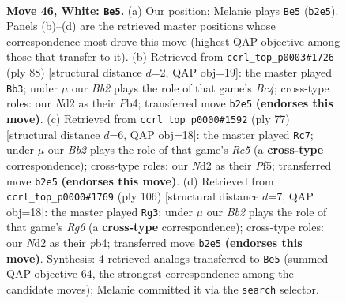 \documentclass[11pt]{article}
\begin{document}
\clearpage

\begin{figure}[p]\centering
\begin{subfigure}{0.46\textwidth}\centering
\resizebox{\linewidth}{!}{%
\newchessgame
\chessboard[
  setfen={5k2/2P5/2r5/8/5K2/8/1B1N4/8 w - - 5 46},
  showmover=false,
  pgfstyle=straightmove, color=movearrow, markmove={b2-e5}
]}
\caption{}
\end{subfigure}\hfill
\begin{subfigure}{0.46\textwidth}\centering
\resizebox{\linewidth}{!}{%
\newchessgame
\chessboard[
  setfen={1k6/8/8/8/PPB5/r7/2K5/8 w - - 1 45},
  showmover=false,
  pgfstyle=straightmove, color=movearrow, markmove={c4-b3}
]}
\caption{}
\end{subfigure}
\\[4pt]
\begin{subfigure}{0.46\textwidth}\centering
\resizebox{\linewidth}{!}{%
\newchessgame
\chessboard[
  setfen={3k4/p7/R7/5p2/2r5/8/8/6K1 b - - 1 39},
  showmover=false,
  pgfstyle=straightmove, color=movearrow, markmove={c4-c7}
]}
\caption{}
\end{subfigure}\hfill
\begin{subfigure}{0.46\textwidth}\centering
\resizebox{\linewidth}{!}{%
\newchessgame
\chessboard[
  setfen={7r/7P/6R1/3k4/1p3K2/8/8/8 w - - 1 54},
  showmover=false,
  pgfstyle=straightmove, color=movearrow, markmove={g6-g3}
]}
\caption{}
\end{subfigure}
\caption{\textbf{Move 46, White: \texttt{Be5}.} (a) Our position; Melanie plays \texttt{Be5} (\texttt{b2e5}). Panels (b)--(d) are the retrieved master positions whose correspondence most drove this move (highest QAP objective among those that transfer to it). (b) Retrieved from \texttt{ccrl\_top\_p0003\#1726} (ply 88) [structural distance $d$=2, QAP obj=19]: the master played \texttt{Bb3}; under $\mu$ our \emph{Bb2} plays the role of that game's \emph{Bc4}; cross-type roles: our \emph{N}d2 as their \emph{P}b4; transferred move \texttt{b2e5} \textbf{(endorses this move)}. (c) Retrieved from \texttt{ccrl\_top\_p0000\#1592} (ply 77) [structural distance $d$=6, QAP obj=18]: the master played \texttt{Rc7}; under $\mu$ our \emph{Bb2} plays the role of that game's \emph{Rc5} (a \textbf{cross-type} correspondence); cross-type roles: our \emph{N}d2 as their \emph{P}f5; transferred move \texttt{b2e5} \textbf{(endorses this move)}. (d) Retrieved from \texttt{ccrl\_top\_p0000\#1769} (ply 106) [structural distance $d$=7, QAP obj=18]: the master played \texttt{Rg3}; under $\mu$ our \emph{Bb2} plays the role of that game's \emph{Rg6} (a \textbf{cross-type} correspondence); cross-type roles: our \emph{N}d2 as their \emph{p}b4; transferred move \texttt{b2e5} \textbf{(endorses this move)}. Synthesis: 4 retrieved analogs transferred to \texttt{Be5} (summed QAP objective 64, the strongest correspondence among the candidate moves); Melanie committed it via the \texttt{search} selector.}
\label{fig:thought-m90}
\end{figure}
\end{document}
